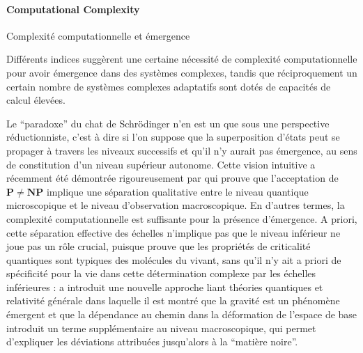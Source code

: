 

\paragraph{Computational Complexity}{Complexité computationnelle et émergence}



Différents indices suggèrent une certaine nécessité de complexité computationnelle pour avoir émergence dans des systèmes complexes, tandis que réciproquement un certain nombre de systèmes complexes adaptatifs sont dotés de capacités de calcul élevées. 

Le ``paradoxe'' du chat de Schrödinger n'en est un que sous une perspective réductionniste, c'est à dire si l'on suppose que la superposition d'états peut se propager à travers les niveaux successifs et qu'il n'y aurait pas émergence, au sens de constitution d'un niveau supérieur autonome. Cette vision intuitive a récemment été démontrée rigoureusement par \cite{2014arXiv1403.7686B} qui prouve que l'acceptation de $\mathbf{P}\neq\mathbf{NP}$ implique une séparation qualitative entre le niveau quantique microscopique et le niveau d'observation macroscopique. En d'autres termes, la complexité computationnelle est suffisante pour la présence d'émergence. A priori, cette séparation effective des échelles n'implique pas que le niveau inférieur ne joue pas un rôle crucial, puisque \cite{vattay2015quantum} prouve que les propriétés de criticalité quantiques sont typiques des molécules du vivant, sans qu'il n'y ait a priori de spécificité pour la vie dans cette détermination complexe par les échelles inférieures : \cite{2016arXiv161102269V} a introduit une nouvelle approche liant théories quantiques et relativité générale dans laquelle il est montré que la gravité est un phénomène émergent et que la dépendance au chemin dans la déformation de l'espace de base introduit un terme supplémentaire au niveau macroscopique, qui permet d'expliquer les déviations attribuées jusqu'alors à la ``matière noire''.

